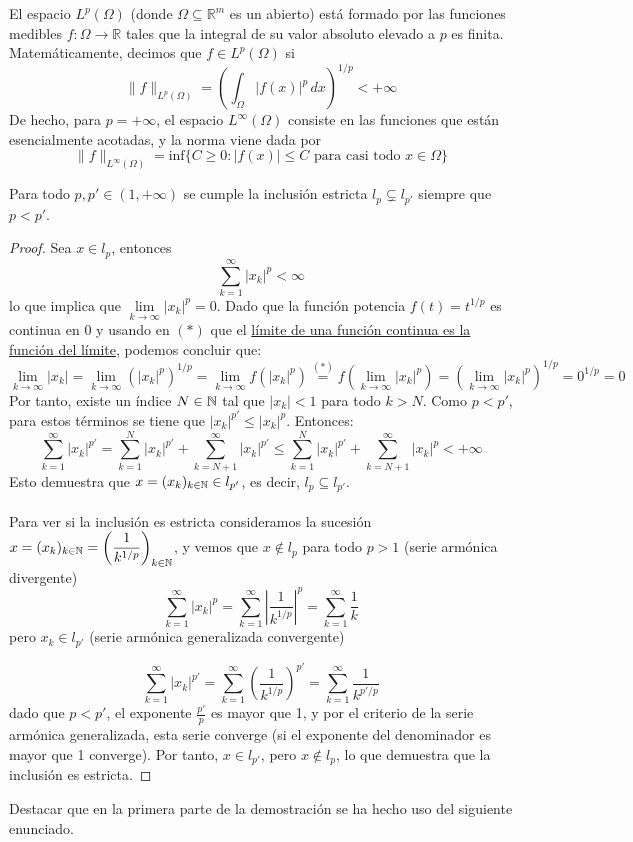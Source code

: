 \begin{definicion}
    El espacio $L^p(\Omega)$ (donde $\Omega \subseteq \mathbb{R}^m$ es un abierto)  está formado por las funciones medibles $f: \Omega \to \mathbb{R}$ tales que la integral de su valor absoluto elevado a $p$ es finita. Matemáticamente, decimos que $f \in L^p(\Omega)$ si
    $$\|f\|_{L^p(\Omega)} = \left( \int_{\Omega} |f(x)|^p \, dx \right)^{1/p} < +\infty$$
    De hecho, para $p = +\infty$, el espacio $L^\infty(\Omega)$ consiste en las funciones que están esencialmente acotadas, y la norma viene dada por
    $$\|f\|_{L^\infty(\Omega)} = \text{inf} \{ C \ge 0 : |f(x)| \le C \text{ para casi todo } x \in \Omega \}$$
\end{definicion}

\begin{prop}
    Para todo $p, p' \in (1, +\infty)$ se cumple la inclusión estricta $l_p \subsetneq l_{p'}$ siempre que $p < p'$.
    \begin{proof}
        Sea $x \in l_p$, entonces 
        $$\sum_{k=1}^\infty |x_k|^p < \infty$$
        lo que implica que $\lim\limits_{k \to \infty} |x_k|^p = 0$. Dado que la función potencia $f(t) = t^{1/p}$ es continua en $0$ y usando en $(*)$ que el \underline{límite de una función continua es la función del límite}, podemos concluir que:
        $$\lim_{k \to \infty} |x_k| =  \lim_{k \to \infty} (|x_k|^p)^{1/p}=\lim_{k \to \infty} f(|x_k|^p)\overset{(*)}{=}f\left(\lim_{k \to \infty} |x_k|^p \right)=\left( \lim_{k \to \infty} |x_k|^p \right)^{1/p} = 0^{1/p} = 0$$
        Por tanto, existe un índice $N \in \mathbb{N}$ tal que $|x_k| < 1$ para todo $k > N$. Como $p < p'$, para estos términos se tiene que $|x_k|^{p'} \leq |x_k|^p$. Entonces:
    \begin{equation*}
        \sum_{k=1}^{\infty} |x_k|^{p'} = \sum_{k=1}^{N} |x_k|^{p'} + \sum_{k=N+1}^{\infty} |x_k|^{p'} \leq \sum_{k=1}^{N} |x_k|^{p'} + \sum_{k=N+1}^{\infty} |x_k|^p < +\infty
    \end{equation*}
    Esto demuestra que $x = (x_k)_{k\in\mathbb{N}} \in l_{p'}$, es decir, $ l_p \subseteq l_{p'}$. \\ \\
    \noindent
    Para ver si la inclusión es estricta consideramos la sucesión $x=(x_k)_{k\in\mathbb{N}} = \left(\dfrac{1}{k^{1/p}}\right)_{k\in\mathbb{N}}$, y vemos que $x \notin l_{p}$ para todo $p> 1$ (serie armónica divergente)
    $$\sum_{k=1}^{\infty} |x_k|^p = \sum_{k=1}^{\infty} \left| \frac{1}{k^{1/p}} \right|^p = \sum_{k=1}^{\infty} \frac{1}{k}$$
    pero $x_k \in l_{p'}$ (serie armónica generalizada convergente)

    $$\sum_{k=1}^{\infty} |x_k|^{p'} = \sum_{k=1}^{\infty} \left( \frac{1}{k^{1/p}} \right)^{p'} = \sum_{k=1}^{\infty} \frac{1}{k^{p'/p}}$$
    dado que $p < p'$, el exponente $\frac{p'}{p}$ es mayor que 1, y por el criterio de la serie armónica generalizada, esta serie converge (si el exponente del denominador es mayor que 1 converge). Por tanto, $x \in l_{p'}$, pero $x \notin l_p$, lo que demuestra que la inclusión es estricta.
    \end{proof}
\end{prop}    
\noindent
Destacar que en la primera parte de la demostración se ha hecho uso del siguiente enunciado.


